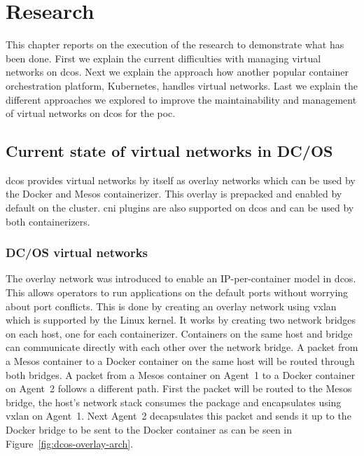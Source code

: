 \chapter{Research}
\label{chap:research}
This chapter reports on the execution of the research to demonstrate what has been done. First we explain the current difficulties with managing virtual networks on \gls{dcos}. Next we explain the approach how another popular container orchestration platform, Kubernetes, handles virtual networks. Last we explain the different approaches we explored to improve the maintainability and management of virtual networks on \gls{dcos} for the \gls{poc}.

\section{Current state of virtual networks in DC/OS}
\label{sec:current-state}
\Gls{dcos} provides virtual networks by itself as overlay networks which can be used by the Docker and Mesos containerizer. This overlay is prepacked and enabled by default on the cluster. \Gls{cni} plugins are also supported on \gls{dcos} and can be used by both containerizers.

\subsection{DC/OS virtual networks}
\label{subsec:dcos-virtual-networks}
The overlay network was introduced to enable an IP-per-container model in \gls{dcos}. This allows operators to run applications on the default ports without worrying about port conflicts. This is done by creating an overlay network using \gls{vxlan}\cite{mahalingam2014virtual} which is supported by the Linux kernel. It works by creating two network bridges on each host, one for each containerizer. Containers on the same host and bridge can communicate directly with each other over the network bridge. A packet from a Mesos container to a Docker container on the same host will be routed through both bridges. A packet from a Mesos container on Agent~1 to a Docker container on Agent~2 follows a different path. First the packet will be routed to the Mesos bridge, the host's network stack consumes the package and encapsulates using \gls{vxlan} on Agent~1. Next Agent~2 decapsulates this packet and sends it up to the Docker bridge to be sent to the Docker container as can be seen in Figure~\ref{fig:dcos-overlay-arch}. 

